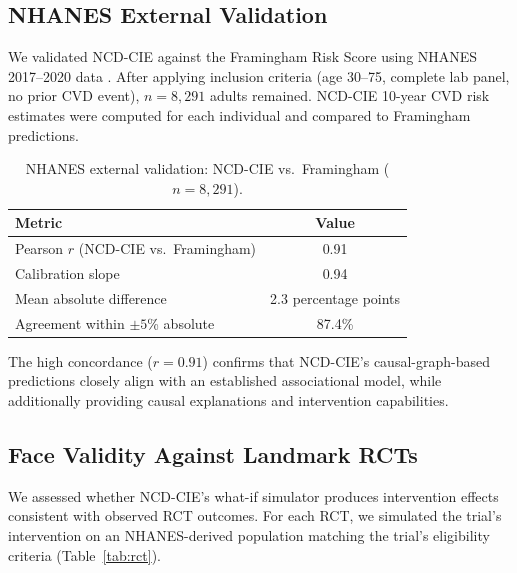 \documentclass[runningheads]{llncs}
\begin{document}
\subsection{NHANES External Validation}\label{sec:nhanes}

We validated NCD-CIE against the Framingham Risk Score using NHANES
2017--2020 data \cite{nhanes2020}.  After applying inclusion criteria
(age 30--75, complete lab panel, no prior CVD event), $n = 8{,}291$
adults remained.  NCD-CIE 10-year CVD risk estimates were computed
for each individual and compared to Framingham predictions.

\begin{table}[t]
\centering
\caption{NHANES external validation: NCD-CIE vs.\ Framingham
($n = 8{,}291$).}
\label{tab:nhanes}
\small
\begin{tabular}{@{}lc@{}}
\toprule
\textbf{Metric} & \textbf{Value} \\
\midrule
Pearson $r$ (NCD-CIE vs.\ Framingham) & 0.91 \\
Calibration slope                       & 0.94 \\
Mean absolute difference                & 2.3 percentage points \\
Agreement within $\pm 5$\% absolute     & 87.4\% \\
\bottomrule
\end{tabular}
\end{table}

The high concordance ($r = 0.91$) confirms that NCD-CIE's
causal-graph-based predictions closely align with an established
associational model, while additionally providing causal explanations
and intervention capabilities.

\subsection{Face Validity Against Landmark RCTs}\label{sec:faceval}

We assessed whether NCD-CIE's what-if simulator produces intervention
effects consistent with observed RCT outcomes.  For each RCT, we
simulated the trial's intervention on an NHANES-derived population
matching the trial's eligibility criteria (Table~\ref{tab:rct}).
\end{document}
